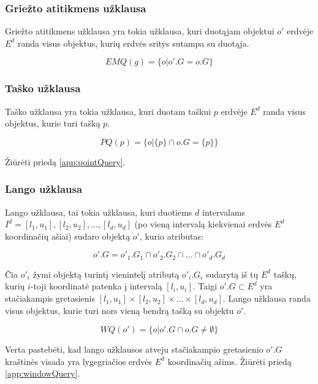 \subsubsection{Griežto atitikmens užklausa}
Griežto atitikmens užklausa yra tokia užklausa, kuri duotąjam objektui $o'$ erdvėje $E^d$ randa visus objektus, kurių erdvės sritys sutampa su duotąja.

\begin{equation}
	EMQ(g) = \{ o | o'.G = o.G \}
\label{eq:ExactMatchQuery}
\end{equation}

\subsubsection{Taško užklausa}
Taško užklausa yra tokia užklausa, kuri duotam taškui $p$ erdvėje $E^d$ randa visus objektus, kurie turi tašką $p$.

\begin{equation}
	PQ(p) = \{ o | \{p\} \cap o.G = \{p\} \}
\label{eq:ExactMatchQuery}
\end{equation}

Žiūrėti priedą \ref{app:pointQuery}.

\subsubsection{Lango užklausa}
Lango užklausa, tai tokia užklausa, kuri duotiems $d$ intervalams $I^d = [l_1, u_1], [l_2, u_2], ..., [l_d, u_d]$ (po vieną intervalą kiekvienai erdvės $E^d$ koordinačių ašiai) sudaro objektą $o'$, kurio atributas:

\begin{equation}
	o'.G = o'_1.G_1 \cap o'_2.G_2 \cap ... \cap o'_d.G_d
\end{equation}

Čia $o'_i$ žymi objektą turintį vienintelį atributą $o'_i.G_i$ sudarytą iš tų $E^d$ taškų, kurių $i$-toji koordinatė patenka į intervalą $[l_i, u_i]$.
Taigi $o'.G \subset E^d$ yra stačiakampis gretasienis $[l_1, u_1] \times [l_2, u_2] \times ... \times [l_d, u_d]$.
Lango užklausa randa visus objektus, kurie turi nors vieną bendrą tašką su objektu $o'$.

\begin{equation}
	WQ(o') = \{ o | o'.G \cap o.G \neq \emptyset \}
\label{eq:ExactMatchQuery}
\end{equation}

Verta pastebėti, kad lango užklausos atveju stačiakampio gretasienio $o'.G$ kraštinės visada yra lygegriačios erdvės $E^d$ koordinačių ašims.
Žiūrėti priedą \ref{app:windowQuery}.


